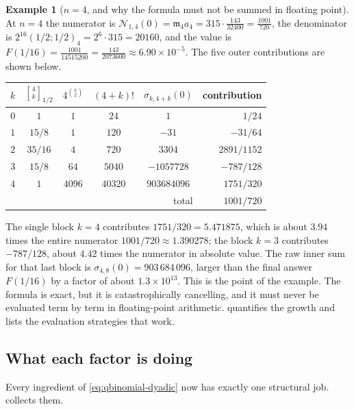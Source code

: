\documentclass[11pt,oneside]{article}
\theoremstyle{definition}
\newtheorem{example}[theorem]{Example}
\theoremstyle{remark}
\newcommand{\qbinom}[3]{\genfrac{[}{]}{0pt}{}{#1}{#2}_{#3}}
\begin{document}
\begin{example}[$n=4$, and why the formula must not be summed in floating point]
\label{ex:qs-n4}
At $n=4$ the numerator is $\mathcal N_{1,4}(0)=\mathfrak m_4a_4=315\cdot\tfrac{143}{32400}
=\tfrac{1001}{720}$, the denominator is $2^{16}(1/2;1/2)_4=2^{6}\cdot315=20160$, and the
value is $F(1/16)=\tfrac{1001}{14515200}=\tfrac{143}{2073600}\approx6.90\times10^{-5}$.  The
five outer contributions are shown below.
\begin{center}
\begin{tabular}{@{}cccccr@{}}
\toprule
$k$&$\qbinom4k{1/2}$&$4^{\binom k2}$&$(4+k)!$&$\sigma_{k,4+k}(0)$&contribution\\
\midrule
$0$&$1$&$1$&$24$&$1$&$1/24$\\
$1$&$15/8$&$1$&$120$&$-31$&$-31/64$\\
$2$&$35/16$&$4$&$720$&$3304$&$2891/1152$\\
$3$&$15/8$&$64$&$5040$&$-1057728$&$-787/128$\\
$4$&$1$&$4096$&$40320$&$903684096$&$1751/320$\\
\midrule
\multicolumn{5}{r}{total}&$1001/720$\\
\bottomrule
\end{tabular}
\end{center}
The single block $k=4$ contributes $1751/320=5.471875$, which is about $3.94$ times the
entire numerator $1001/720\approx1.390278$; the block $k=3$ contributes $-787/128$, about
$4.42$ times the numerator in absolute value.  The raw inner sum for that last block is
$\sigma_{4,8}(0)=903\,684\,096$, larger than the final answer $F(1/16)$ by a factor of about
$1.3\times10^{13}$.  This is the point of the example.  The formula is exact, but it is
catastrophically cancelling, and it must never be evaluated term by term in floating-point
arithmetic.   quantifies the growth and lists the evaluation
strategies that work.
\end{example}

\subsection{What each factor is doing}
\label{subsec:qs-roles}

Every ingredient of \eqref{eq:qbinomial-dyadic} now has exactly one structural job.
 collects them.
\end{document}
